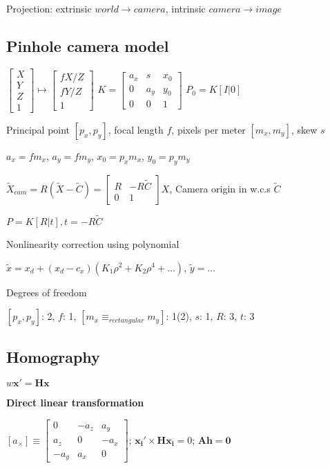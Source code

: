 \documentclass{article}
\begin{document}
\begin{multicols*}{2}
{Projection: extrinsic $world \to camera$, intrinsic $camera \to image$


\subsection{Pinhole camera model}

$\left[ \begin{array}{c}
	X \\ Y \\ Z \\ 1
\end{array} \right]
\mapsto
\left[ \begin{array}{c}
	fX/Z \\ fY/Z \\ 1
\end{array} \right]
$
$K = \left[ \begin{array}{ccc}
	a_x & s & x_0 \\
	0 & a_y & y_0 \\
	0 & 0 & 1
\end{array} \right]$
$P_0 = K[I|0]$

Principal point $[p_x, p_y]$, focal length $f$, pixels per meter $[m_x, m_y]$, skew $s$

$a_x = f m_x$, $a_y = f m_y$, $x_0 = p_x m_x$, $y_0 = p_y m_y$

$\tilde{X}_{cam} = R(\tilde{X}-\tilde{C}) = 
\left[ \begin{array}{cc}
	R & -R\tilde{C} \\
	0 & 1
\end{array} \right] X$, Camera origin in w.c.s $\tilde{C}$

$P = K[R|t], t=-R\tilde{C}$

Nonlinearity correction using polynomial

$\tilde{x} = x_d + (x_d - c_x)(K_1\rho^2+K_2\rho^4+\dots)$, $\tilde{y} = \dots$

Degrees of freedom

$[p_x, p_y]$: 2, $f$: 1, $[m_x \equiv_{rectangular} m_y]$: 1(2), $s$: 1, $R$: 3, $t$: 3

\subsection{Homography}

$w \mathbf{x' = H x}$

\textbf{Direct linear transformation}

$[a_\times]\equiv \left[ \begin{array}{ccc}
	0 & -a_z & a_y \\
	a_z & 0 & -a_x \\
	-a_y & a_x & 0
\end{array} \right]$;
$\mathbf{x_i' \times H x_i} = 0$; $\mathbf{Ah = 0}$

}
\end{multicols*}
\end{document}
